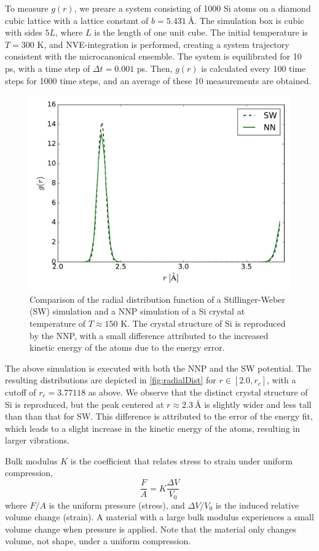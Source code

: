 \documentclass[twoside,english]{uiofysmaster}
\begin{document}
To measure $g(r)$, we preare a system consisting of 1000 Si atoms on a diamond cubic lattice with a lattice constant 
of $b = \SI{5.431}{\angstrom}$. The simulation box is cubic with sides $5L$, where $L$ is the length of one unit cube.
The initial temperature is $T = 300$ K, and NVE-integration is performed, creating a system trajectory consistent with 
the microcanonical ensemble. The system is equilibrated for 10 ps, with a time step of $\Delta t = 0.001$ ps. Then, 
$g(r)$ is calculated every 100 time steps for 1000 time steps, and an average of these 10 measurements are obtained. 
\begin{figure}
\centering
  \includegraphics[width = 0.8\linewidth]{Figures/Results/radialDist.pdf}
  \caption{Comparison of the radial distribution function of a Stillinger-Weber (SW) simulation and 
           a NNP simulation of a Si crystal at temperature of $T \approx 150$ K. The crystal structure 
           of Si is reproduced by the NNP, with a small difference attributed to the increased kinetic 
           energy of the atoms due to the energy error. }
  \label{fig:radialDist}
\end{figure}

The above simulation is executed with both the NNP and the SW potential. The resulting distributions are 
depicted in \autoref{fig:radialDist} for $r \in [2.0, r_c]$, with a cutoff of $r_c = 3.77118$ as above. 
We observe that the distinct crystal structure of Si is reproduced, but the peak centered at $r \approx \SI{2.3}{\angstrom}$
is slightly wider and less tall than than that for SW. This difference is attributed to the error of the energy fit, 
which leads to a slight increase in the kinetic energy of the atoms, resulting in larger vibrations. 

Bulk modulus $K$ is the coefficient that relates stress to strain under uniform compression,
\begin{equation}
 \frac{F}{A} = K\frac{\Delta V}{V_0}
\end{equation}
where $F/A$ is the uniform pressure (stress), and $\Delta V/V_0$ is the induced relative volume change (strain). 
A material with a large bulk modulus experiences a small volume change when pressure is applied. Note that the material 
only changes volume, not shape, under a uniform compression.
\end{document}
